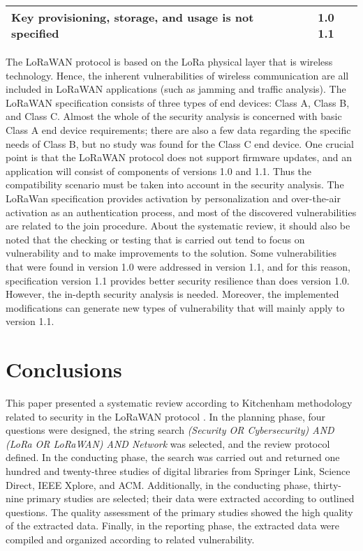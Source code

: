 \documentclass[manuscript,screen,review=false]{acmart}
\begin{document}
\begin{table}[!ht]
\begin{tabular}{p{}|p{}|p{}|p{}|p{}}
    Key provisioning, storage, and usage is not specified
    & \cite{01_formal_security_analysis_LoRaWAN}
    \cite{02_security_procedure_LoRaWANv1.1}
    \cite{24_securely_IoT_lorawan}
    \cite{70_low_throughput_networks_IoT}
    &  
    & 
    & 1.0 1.1 \\ \hline
    
    \end{tabular}
\end{table}

The LoRaWAN protocol is based on the LoRa physical layer that is wireless technology. Hence, the inherent vulnerabilities of wireless communication are all included in LoRaWAN applications (such as jamming and traffic analysis). The LoRaWAN specification consists of three types of end devices: Class A, Class B, and Class C. 
Almost the whole of the security analysis is concerned with basic Class A end device requirements; there are also a few data regarding the specific needs of Class B, but no study was found for the Class C end device. One crucial point is that the LoRaWAN protocol does not support firmware updates, and an application will consist of components of versions 1.0 and 1.1. Thus the compatibility scenario must be taken into account in the security analysis. The LoRaWan specification provides activation by personalization and over-the-air activation as an authentication process, and most of the discovered vulnerabilities are related to the join procedure. About the systematic review, it should also be noted that the checking or testing that is carried out tend to focus on vulnerability and to make improvements to the solution. Some vulnerabilities that were found in version 1.0 were addressed in version 1.1, and for this reason, specification version 1.1 provides better security resilience than does version 1.0. However, the in-depth security analysis is needed. Moreover, the implemented modifications can generate new types of vulnerability that will mainly apply to version 1.1.

\section{Conclusions}
This paper presented a systematic review according to Kitchenham methodology related to security in the LoRaWAN protocol \cite{kitchenham}. In the planning phase, four questions were designed, the string search \textit{(Security OR Cybersecurity) AND (LoRa OR LoRaWAN) AND Network} was selected, and the review protocol defined. In the conducting phase, the search was carried out and returned one hundred and twenty-three studies of digital libraries from Springer Link, Science Direct, IEEE Xplore, and ACM. Additionally, in the conducting phase, thirty-nine primary studies are selected; their data were extracted according to outlined questions. The quality assessment of the primary studies showed the high quality of the extracted data. Finally, in the reporting phase, the extracted data were compiled and organized according to related vulnerability.
\end{document}
